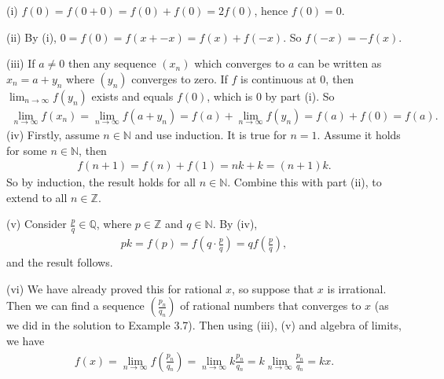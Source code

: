 \documentclass[letterpaper,10pt,english]{jupyterBook}
\begin{document}
\sphinxAtStartPar
{\hyperref[\detokenize{Problems:id21}]{}}
(i) \(f(0) = f(0 + 0) = f(0) + f(0) = 2f(0)\), hence \(f(0) = 0\).

\sphinxAtStartPar
(ii) By (i), \(0 = f(0) = f(x + -x) = f(x) + f(-x)\). So \(f(-x)=-f(x)\).

\sphinxAtStartPar
(iii) If \(a \neq 0\) then any sequence \((x_{n})\) which converges to \(a\) can be written as \(x_{n} = a + y_{n}\) where \((y_{n})\) converges to zero. If \(f\) is continuous at \(0\), then \( \lim_{n\rightarrow\infty} f(y_{n})\) exists and equals \(f(0)\), which is \(0\) by part (i). So
\begin{equation*}
\begin{split}
\lim_{n\rightarrow\infty} f(x_{n}) = \lim_{n\rightarrow\infty} f(a + y_{n}) = f(a) + \lim_{n\rightarrow\infty} f(y_{n}) = f(a) + f(0) = f(a).
\end{split}
\end{equation*}
\sphinxAtStartPar
(iv) Firstly, assume \(n\in\mathbb{N}\) and use induction. It is true for \(n = 1\). Assume it holds for some \(n\in\mathbb{N}\), then
\begin{equation*}
\begin{split}
f(n+1) = f(n) + f(1) = nk + k = (n+1)k.
\end{split}
\end{equation*}
\sphinxAtStartPar
So by induction, the result holds for all \(n\in\mathbb{N}\).
Combine this with part (ii), to extend to all \(n\in \mathbb{Z}\).

\sphinxAtStartPar
(v) Consider \(\frac{p}{q}\in\mathbb{Q}\), where \(p\in \mathbb{Z}\) and \(q\in \mathbb{N}\). By (iv),
\begin{equation*}
\begin{split}
pk = f(p) = f\left(q\cdot \frac{p}{q}\right) = qf\left(\frac{p}{q}\right),
\end{split}
\end{equation*}
\sphinxAtStartPar
and the result follows.

\sphinxAtStartPar
(vi) We have already proved this for rational \(x\), so suppose that \(x\) is irrational. Then we can find a sequence \(\left(\frac{p_{n}}{q_{n}}\right)\) of rational numbers that converges to \(x\) (as we did in the solution to Example 3.7). Then using (iii), (v) and algebra of limits, we have
\begin{equation*}
\begin{split}
f(x) = \lim_{n\rightarrow\infty} f\left(\frac{p_n}{q_n}\right) =   \lim_{n\rightarrow\infty} k \frac{p_n}{q_n}=k \lim_{n\rightarrow\infty} \frac{p_n}{q_n} = kx.
\end{split}
\end{equation*}
\end{document}
